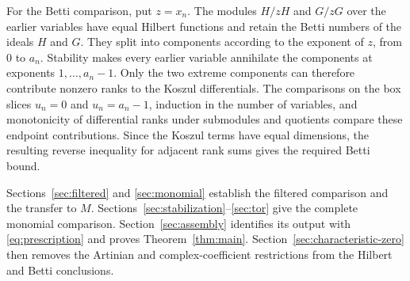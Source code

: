 For the Betti comparison, put \(z=x_n\). The modules \(H/zH\) and
\(G/zG\) over the earlier variables have equal Hilbert functions and
retain the Betti numbers of the ideals \(H\) and \(G\). They split
into components according to the exponent of \(z\), from \(0\) to
\(a_n\). Stability makes every earlier variable annihilate the
components at exponents \(1,\ldots,a_n-1\). Only the two extreme
components can therefore contribute nonzero ranks to the Koszul
differentials. The comparisons on the box slices \(u_n=0\) and
\(u_n=a_n-1\), induction in the number of variables, and monotonicity
of differential ranks under submodules and quotients compare these
endpoint contributions. Since the Koszul terms have equal dimensions,
the resulting reverse inequality for adjacent rank sums gives the
required Betti bound.

Sections~\ref{sec:filtered} and \ref{sec:monomial} establish the filtered
comparison and the transfer to \(M\).
Sections~\ref{sec:stabilization}--\ref{sec:tor} give the complete monomial
comparison. Section~\ref{sec:assembly} identifies its output with
\eqref{eq:prescription} and proves Theorem~\ref{thm:main}.
Section~\ref{sec:characteristic-zero} then removes the Artinian and
complex-coefficient restrictions from the Hilbert and Betti conclusions.

